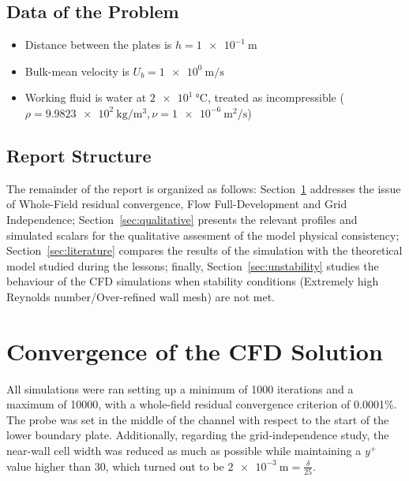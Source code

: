 \documentclass[12pt]{article}
\begin{document}
        \subsection{Data of the Problem}

                \begin{itemize}
                        \item Distance between the plates is \( h = \SI{1e-1}{\metre} \)
                        \item Bulk-mean velocity is \( U_b = \SI{1e0}{\metre \per \second} \)
                        \item Working fluid is water at \( \SI{2e1}{\celsius} \), treated as incompressible (\( \rho = \SI{9.9823e2}{\kilogram \per \metre \cubed} , \nu = \SI{1e-6}{\metre \squared \per \second} \))
                \end{itemize}
        
        \subsection{Report Structure}

                The remainder of the report is organized as follows: Section~\ref{sec:convergence} addresses the issue of Whole-Field residual convergence, Flow Full-Development and Grid Independence; Section~\ref{sec:qualitative} presents the relevant profiles and simulated scalars for the qualitative assesment of the model physical consistency; Section~\ref{sec:literature} compares the results of the simulation with the theoretical model studied during the lessons; finally, Section~\ref{sec:unstability} studies the behaviour of the CFD simulations when stability conditions (Extremely high Reynolds number/Over-refined wall mesh) are not met.

\section{Convergence of the CFD Solution} \label{sec:convergence}

        All simulations were ran setting up a minimum of 1000 iterations and a maximum of 10000, with a whole-field residual convergence criterion of 0.0001\%. The probe was set in the middle of the channel with respect to the start of the lower boundary plate. Additionally, regarding the grid-independence study, the near-wall cell width was reduced as much as possible while maintaining a \( y^+ \) value higher than 30, which turned out to be \( \SI{2e-3}{\metre} = \frac{\delta}{25} \).
\end{document}
